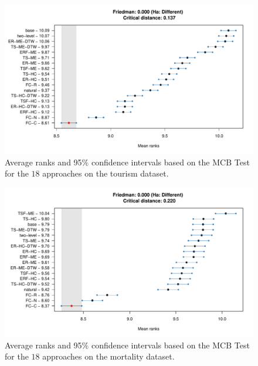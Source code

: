 \documentclass[a4paper,review,12pt,authoryear]{elsarticle}
\begin{document}
\begin{figure}
    \centering
    \includegraphics[width=\textwidth]{figures/tourism_mcb.pdf}
    \caption{\label{fig:tourism_mcb}Average ranks and 95\% confidence intervals based on the MCB Test for the $18$ approaches on the tourism dataset.}
\end{figure}

\begin{figure}
    \centering
    \includegraphics[width=\textwidth]{figures/mortality_mcb.pdf}
    \caption{\label{fig:mortality_mcb}Average ranks and 95\% confidence intervals based on the MCB Test for the $18$ approaches on the mortality dataset.}
\end{figure}
\end{document}
